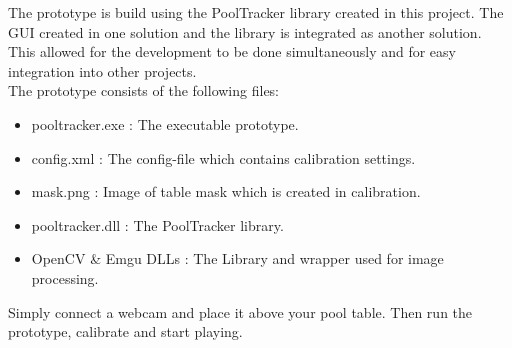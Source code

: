 The prototype is build using the PoolTracker library created in this project. The GUI created in one solution and the library is integrated as another solution. This allowed for the development to be done simultaneously and for easy integration into other projects.\\

The prototype consists of the following files:
\begin{itemize}
\setlength{\itemsep}{0mm}
	\item pooltracker.exe : The executable prototype.
	\item config.xml	  : The config-file which contains calibration settings.
	\item mask.png		  : Image of table mask which is created in calibration.
	\item pooltracker.dll : The PoolTracker library.
	\item OpenCV \& Emgu DLLs  : The Library and wrapper used for image processing.
\end{itemize}

Simply connect a webcam and place it above your pool table. Then run the prototype, calibrate and start playing.